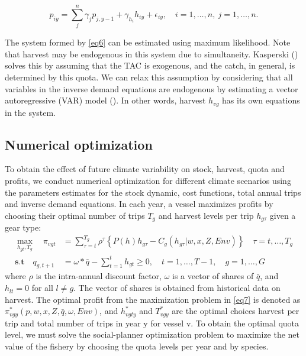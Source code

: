 \documentclass[
  11pt,
]{article}
\begin{document}
\begin{equation}
p_{iy} = \sum_j^n \gamma_j p_{j,y-1} + \gamma_{h_i} h_{iy} + \epsilon_{iy}, \quad i = 1,\ldots,n, \ j = 1,\ldots,n.
\label{eq6}
\end{equation}

The system formed by \eqref{eq6} can be estimated using maximum
likelihood. Note that harvest may be endogenous in this system due to
simultaneity. Kasperski () solves
this by assuming that the TAC is exogenous, and the catch, in general,
is determined by this quota. We can relax this assumption by considering
that all variables in the inverse demand equations are endogenous by
estimating a vector autoregressive (VAR) model
(). In other
words, harvest \(h_{vg}\) has its own equations in the system.

\subsection{Numerical optimization}\label{numerical-optimization}

To obtain the effect of future climate variability on stock, harvest,
quota and profits, we conduct numerical optimization for different
climate scenarios using the parameters estimates for the stock dynamic,
cost functions, total annual trips and inverse demand equations. In each
year, a vessel maximizes profits by choosing their optimal number of
trips \(T_g\) and harvest levels per trip \(h_{g\tau}\) given a gear
type: \begin{align}
\max_{h_{gt}, T_g} \quad \pi_{vgt} & = \sum_{\tau=t}^{T_g} \rho^\tau \left\{ P(h) h_{g\tau} - C_g(h_{g\tau} | w, x, Z, Env) \right\} \quad \tau = t,\ldots, T_g \nonumber \\
\textbf{s.t} \quad q_{g,t+1} & = \omega \ast \bar{q} - \sum_{t=1}^{t} h_{gt} \geq 0, \quad t = 1, \dots, T-1, \quad g = 1, \dots, G
\label{eq7}
\end{align} where \(\rho\) is the intra-annual discount factor,
\(\omega\) is a vector of shares of \(\bar{q}\), and \(h_{lt}=0\) for
all \(l\neq g\). The vector of shares is obtained from historical data
on harvest. The optimal profit from the maximization problem in
\eqref{eq7} is denoted as \(\pi_{vgy}^* (p,w,x,Z,\bar{q},\omega, Env)\),
and \(h_{vgty}^*\) and \(T_{vgy}^*\) are the optimal choices harvest per
trip and total number of trips in year y for vessel v. To obtain the
optimal quota level, we must solve the social-planner optimization
problem to maximize the net value of the fishery by choosing the quota
levels per year and by species.
\end{document}
